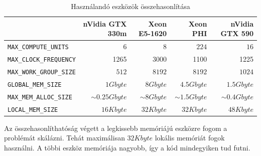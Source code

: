 	\begin{table}[!h]
	\setlength{\extrarowheight}{8pt}
	\centering
	\footnotesize
	\begin{tabular}{ l | r | r | r | r}
		 & nVidia GTX 330m & Xeon E5-1620 & Xeon PHI & nVidia GTX 590\\ \hline
		\texttt{MAX\_COMPUTE\_UNITS} & $6$ & $8$ & $224$ & $16$\\
		\texttt{MAX\_CLOCK\_FREQUENCY} & 1265 & 3000 & 1100 & 1225\\
		\texttt{MAX\_WORK\_GROUP\_SIZE} & $512$ & $8192$ & $8192$ & $1024$\\ \hline\hline
		\texttt{GLOBAL\_MEM\_SIZE} & $1Gbyte$ & $8Gbyte$ & $4.5Gbyte$ & $1.5Gbyte$\\
		\texttt{MAX\_MEM\_ALLOC\_SIZE} & $\sim 0.25Gbyte$ & $\sim 8Gbyte$ & $\sim 1.5Gbyte$ & $\sim 0.4Gbyte$\\
		\texttt{LOCAL\_MEM\_SIZE} & $16 Kbyte$ & $32 Kbyte$ & $32 Kbyte$ & $48 Kbyte$\\
	\end{tabular}
	
	\caption{Használandó eszközök összehasonlítása}
	\label{table:envs}
	\end{table}
	
	Az összehasonlíthatóság végett a legkissebb memóriájú eszközre fogom a problémát skálázni. Tehát maximálisan $32 Kbyte$ lokális
	memóriát fogok használni. A többi eszköz memóriája nagyobb, így a kód mindegyiken tud futni.
	